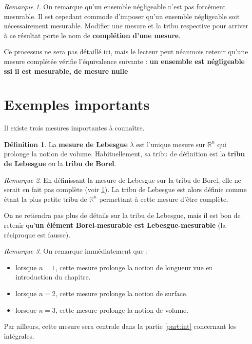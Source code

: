 \documentclass[french]{report}
\theoremstyle{plain}
\theoremstyle{definition}
\newtheorem{defi}{Définition}[section]
\theoremstyle{remark}
\newtheorem{rem}{Remarque}[section]
\newcommand\itemb{\item[$\bullet$]}
\begin{document}
\begin{rem}
  \label{rem:completion}
  On remarque qu'un ensemble négligeable n'est pas forcément mesurable.
  Il est cepedant commode d'imposer qu'un ensemble négligeable soit nécessairement mesurable.
  Modifier une mesure et la tribu respective pour arriver à ce résultat porte le nom de \textbf{complétion d'une mesure}.

  Ce processus ne sera pas détaillé ici, mais le lecteur peut néanmois retenir qu'une mesure complétée vérifie l'équivalence suivante : \textbf{un ensemble est négligeable ssi il est mesurable, de mesure nulle}
\end{rem}

\section{Exemples importants}
Il existe trois mesures importantes à connaître.

\begin{defi}
  La \textbf{mesure de Lebesgue} $\lambda$ est l'unique mesure sur $\mathbb{R}^n$ qui prolonge la notion de volume.
  Habituellement, sa tribu de définition est la \textbf{tribu de Lebesgue} ou la \textbf{tribu de Borel}.
\end{defi}

\begin{rem}
  En définissant la mesure de Lebesgue sur la tribu de Borel, elle ne serait en fait pas complète (voir \ref{rem:completion}).
  La tribu de Lebesgue est alors définie comme étant la plus petite tribu de $\mathbb{R}^n$ permettant à cette mesure d'être complète.
  
  On ne retiendra pas plus de détails sur la tribu de Lebesgue, mais il est bon de retenir qu'\textbf{un élément Borel-mesurable est Lebesgue-mesurable} (la réciproque est fausse).
\end{rem}

\begin{rem}
  On remarque immédiatement que :
  \begin{itemize}
    \itemb lorsque $n=1$, cette mesure prolonge la notion de longueur vue en introduction du chapitre.
    \itemb lorsque $n=2$, cette mesure prolonge la notion de surface.
    \itemb lorsque $n=3$, cette mesure prolonge la notion de volume.
  \end{itemize}

  Par ailleurs, cette mesure sera centrale dans la partie \ref{part:int} concernant les intégrales.
\end{rem}
\end{document}
